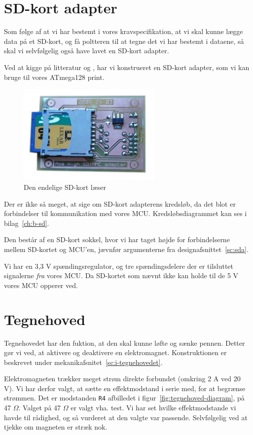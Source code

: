 \section{SD-kort adapter}
Som følge af at vi har bestemt i vores kravspecifikation, at vi skal
kunne lægge data på et SD-kort, og få poltteren til at tegne det vi
har bestemt i dataene, så skal vi selvfølgelig også have lavet en
SD-kort adapter.

Ved at kigge på litteratur \cite{web:captain-mmc} og
\cite{web:sd-pinout}, har vi konstrueret en SD-kort adapter, som vi kan bruge
til vores ATmega128 print.

\begin{figure}[htbp]
  \centering
  \includegraphics[width=7cm]{./img/sd-adapter}
  \caption{Den endelige SD-kort læser}
  \label{fig:sd-adapter}
\end{figure}

Der er ikke så meget, at sige om SD-kort adapterens kredsløb, da det
blot er forbindelser til kommunikation med vores
MCU. Kredsløbsdiagrammet kan ses i bilag~\vref{ch:b-sd}.

Den består af en SD-kort sokkel, hvor vi har taget højde for
forbindelserne mellem SD-kortet og MCU'en, jævnfør argumenterne fra
designafsnittet~\vref{sc:sda}.

Vi har en 3,3 V spændingsregulator, og tre spændingsdelere der er
tilsluttet signalerne \textit{fra} vores MCU. Da SD-kortet som nævnt
ikke kan holde til de 5 V vores MCU opperer ved.

\section{Tegnehoved}
Tegnehovedet har den fuktion, at den skal kunne løfte og sænke
pennen. Detter gør vi ved, at aktivere og deaktivere en
elektromagnet. Konstruktionen er beskrevet under
mekanikafsnitet~\vref{sc:i-tegnehovedet}.

Elektromagneten trækker meget strøm direkte forbundet (omkring 2 A ved
20 V). Vi har derfor valgt, at sætte en effektmodstand i serie med, for
at begrænse strømmen. Det er modstanden \texttt{R4} afbilledet i
figur~\vref{fig:tegnehoved-diagram}, på 47 $\Omega$. Valget på
47 $\Omega$ er valgt vha. test. Vi har set hvilke effektmodstande vi
havde til rådighed, og så vurderet at den valgte var
passende. Selvfølgelig ved at tjekke om magneten er stræk nok.

